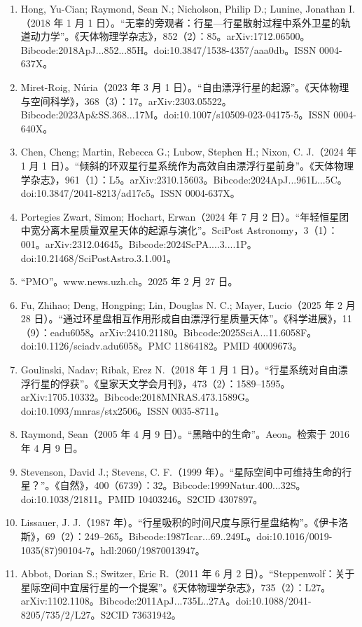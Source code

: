 \begin{enumerate}
\item Hong, Yu-Cian; Raymond, Sean N.; Nicholson, Philip D.; Lunine, Jonathan I.（2018 年 1 月 1 日）。“无辜的旁观者：行星—行星散射过程中系外卫星的轨道动力学”。《天体物理学杂志》，852（2）：85。arXiv:1712.06500。Bibcode:2018ApJ...852...85H。doi:10.3847/1538-4357/aaa0db。ISSN 0004-637X。  
\item Miret-Roig, Núria（2023 年 3 月 1 日）。“自由漂浮行星的起源”。《天体物理与空间科学》，368（3）：17。arXiv:2303.05522。Bibcode:2023Ap\&SS.368...17M。doi:10.1007/s10509-023-04175-5。ISSN 0004-640X。  
\item Chen, Cheng; Martin, Rebecca G.; Lubow, Stephen H.; Nixon, C. J.（2024 年 1 月 1 日）。“倾斜的环双星行星系统作为高效自由漂浮行星前身”。《天体物理学杂志》，961（1）：L5。arXiv:2310.15603。Bibcode:2024ApJ...961L...5C。doi:10.3847/2041-8213/ad17c5。ISSN 0004-637X。  
\item Portegies Zwart, Simon; Hochart, Erwan（2024 年 7 月 2 日）。“年轻恒星团中宽分离木星质量双星天体的起源与演化”。SciPost Astronomy，3（1）：001。arXiv:2312.04645。Bibcode:2024ScPA....3....1P。doi:10.21468/SciPostAstro.3.1.001。  
\item “PMO”。www.news.uzh.ch。2025 年 2 月 27 日。  
\item Fu, Zhihao; Deng, Hongping; Lin, Douglas N. C.; Mayer, Lucio（2025 年 2 月 28 日）。“通过环星盘相互作用形成自由漂浮行星质量天体”。《科学进展》，11（9）：eadu6058。arXiv:2410.21180。Bibcode:2025SciA...11.6058F。doi:10.1126/sciadv.adu6058。PMC 11864182。PMID 40009673。  
\item Goulinski, Nadav; Ribak, Erez N.（2018 年 1 月 1 日）。“行星系统对自由漂浮行星的俘获”。《皇家天文学会月刊》，473（2）：1589--1595。arXiv:1705.10332。Bibcode:2018MNRAS.473.1589G。doi:10.1093/mnras/stx2506。ISSN 0035-8711。  
\item Raymond, Sean（2005 年 4 月 9 日）。“黑暗中的生命”。Aeon。检索于 2016 年 4 月 9 日。  
\item Stevenson, David J.; Stevens, C. F.（1999 年）。“星际空间中可维持生命的行星？”。《自然》，400（6739）：32。Bibcode:1999Natur.400...32S。doi:10.1038/21811。PMID 10403246。S2CID 4307897。  
\item Lissauer, J. J.（1987 年）。“行星吸积的时间尺度与原行星盘结构”。《伊卡洛斯》，69（2）：249--265。Bibcode:1987Icar...69..249L。doi:10.1016/0019-1035(87)90104-7。hdl:2060/19870013947。  
\item Abbot, Dorian S.; Switzer, Eric R.（2011 年 6 月 2 日）。“Steppenwolf：关于星际空间中宜居行星的一个提案”。《天体物理学杂志》，735（2）：L27。arXiv:1102.1108。Bibcode:2011ApJ...735L..27A。doi:10.1088/2041-8205/735/2/L27。S2CID 73631942。  

\end{enumerate}

